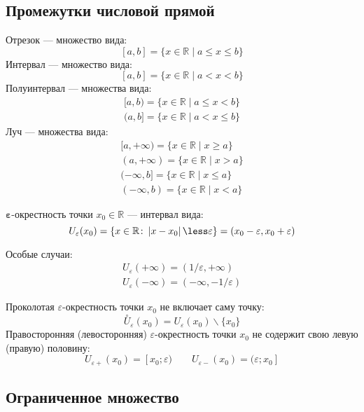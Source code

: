 \subsection{Промежутки числовой прямой}

{\bold Отрезок} --- множество вида:
$$[a,b]=\{x\in\mathbb{R}\mid a\leq x\leq b\}$$
{\bold Интервал} --- множество вида:
$$[a,b]=\{x\in\mathbb{R}\mid a\less x\less b\}$$
{\bold Полуинтервал} --- множества вида:
$$\begin{gathered}
[a,b)=\{x\in\mathbb{R}\mid a\leq x\less b\}\\
(a,b]=\{x\in\mathbb{R}\mid a\less x\leq b\}
\end{gathered}$$
{\bold Луч} --- множества вида:
$$\begin{gathered}
[a,+\infty)=\{x\in\mathbb{R}\mid x\geq a\}\\
(a,+\infty)=\{x\in\mathbb{R}\mid x\greater a\}\\
(-\infty,b]=\{x\in\mathbb{R}\mid x\leq a\}\\
(-\infty,b)=\{x\in\mathbb{R}\mid x\less a\}
\end{gathered}$$
\begin{theorem}
{\bold $\symbf{\varepsilon}$-окрестность} точки $x_0\in\mathbb{R}$ --- интервал вида:
$$U_\varepsilon(x_0)=\{x\in\mathbb{R}\colon\abs{x-x_0}\less\varepsilon\}=(x_0-\varepsilon,x_0+\varepsilon)$$

Особые случаи:
$$\begin{gathered}
U_\varepsilon(+\infty)=(1/\varepsilon,+\infty)\\
U_\varepsilon(-\infty)=(-\infty,-1/\varepsilon)
\end{gathered}$$
\end{theorem}
{\bold Проколотая} $\varepsilon$-окрестность точки $x_0$ не включает саму точку:\\[-8pt]
$$\overset{\circ}{U}_\varepsilon(x_0)=U_\varepsilon(x_0)\backslash\{x_0\}$$
{\bold Правосторонняя (левосторонняя)} $\varepsilon$-окрестность точки $x_0$
не содержит свою {\ital левую  (правую)} половину:
$$U_{\varepsilon+}(x_0)=[x_0;\varepsilon)\quad\quad U_{\varepsilon-}(x_0)=(\varepsilon;x_0]$$

\subsection{Ограниченное множество}

